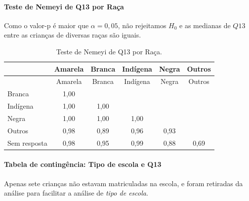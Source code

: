 \documentclass[]{article}
\let\oldparagraph\paragraph
\renewcommand{\paragraph}[1]{\oldparagraph{#1}\mbox{}}
\begin{document}
\hypertarget{teste-de-nemeyi-de-q13-por-rauxe7a}{%
\paragraph{Teste de Nemeyi de Q13 por Raça}\label{teste-de-nemeyi-de-q13-por-rauxe7a}}

Como o valor-p é maior que \(\alpha=0,05\), não rejeitamos \(H_0\) e as medianas de \(Q13\) entre as crianças de diversas raças são iguais.

\begin{longtable}[]{@{}lccccc@{}}
\caption{\label{tab:unnamed-chunk-82}Teste de Nemeyi de Q13 por Raça.}\tabularnewline
\toprule
& Amarela & Branca & Indígena & Negra & Outros\tabularnewline
\midrule
\endfirsthead
\toprule
& Amarela & Branca & Indígena & Negra & Outros\tabularnewline
\midrule
\endhead
Branca & 1,00 & & & &\tabularnewline
Indígena & 1,00 & 1,00 & & &\tabularnewline
Negra & 1,00 & 1,00 & 1,00 & &\tabularnewline
Outros & 0,98 & 0,89 & 0,96 & 0,93 &\tabularnewline
Sem resposta & 0,98 & 0,95 & 0,99 & 0,88 & 0,69\tabularnewline
\bottomrule
\end{longtable}

\cleardoublepage

\hypertarget{tabela-de-continguxeancia-tipo-de-escola-e-q13}{%
\paragraph{Tabela de contingência: Tipo de escola e Q13}\label{tabela-de-continguxeancia-tipo-de-escola-e-q13}}

Apenas sete crianças não estavam matriculadas na escola, e foram retiradas da análise para facilitar a análise de \emph{tipo de escola}.
\end{document}
